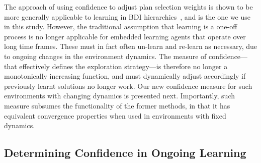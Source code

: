 The approach of using confidence to adjust plan selection weights is shown to be more generally applicable to learning in BDI hierarchies~\cite{singh10:extending,singh10:learning}, and is the one we use in this study. However, the traditional assumption that learning is a one-off process is no longer applicable for embedded learning agents that operate over long time frames. These must in fact often un-learn and re-learn as necessary, due to ongoing changes in the environment dynamics. The measure of confidence---that effectively defines the exploration strategy---is therefore no longer a monotonically increasing function, and must dynamically adjust accordingly if previously learnt solutions no longer work. Our new confidence measure for such environments with changing dynamics is presented next. 
Importantly, such measure subsumes the functionality of the former methods, in that it has equivalent convergence properties when used in environments with fixed dynamics. 

\subsection{Determining Confidence in Ongoing Learning}\label{sec:confidence}

\newcommand{\ds}{\zeta}
\newcommand{\app}{\mathname{app}}
\newcommand{\stable}{\mathname{stable}}


